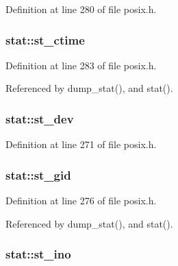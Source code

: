 Definition at line 280 of file posix.\+h.

\subsubsection[{\texorpdfstring{st\+\_\+ctime}{st_ctime}}]{ stat\+::st\+\_\+ctime}\hypertarget{structstat_a1b4b858db1ebe79c3d6e0fc1ef721024}{}\label{structstat_a1b4b858db1ebe79c3d6e0fc1ef721024}


Definition at line 283 of file posix.\+h.



Referenced by dump\+\_\+stat(), and stat().

\subsubsection[{\texorpdfstring{st\+\_\+dev}{st_dev}}]{ stat\+::st\+\_\+dev}\hypertarget{structstat_ac5b90090ae323741ae4c9e4f3683a29f}{}\label{structstat_ac5b90090ae323741ae4c9e4f3683a29f}


Definition at line 271 of file posix.\+h.

\subsubsection[{\texorpdfstring{st\+\_\+gid}{st_gid}}]{ stat\+::st\+\_\+gid}\hypertarget{structstat_ab864f16f436cec370f0ced585d897698}{}\label{structstat_ab864f16f436cec370f0ced585d897698}


Definition at line 276 of file posix.\+h.



Referenced by dump\+\_\+stat(), and stat().

\subsubsection[{\texorpdfstring{st\+\_\+ino}{st_ino}}]{ stat\+::st\+\_\+ino}\hypertarget{structstat_a9769ed8f0d4c5a9f329c32bc92479d56}{}\label{structstat_a9769ed8f0d4c5a9f329c32bc92479d56}


